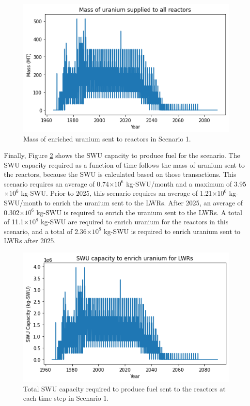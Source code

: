 \begin{figure}
    \centering 
    \includegraphics[width=\textwidth]{../figures/fuelsupply_scenarios_1.png}
    \caption{Mass of enriched uranium sent to reactors in Scenario 1.}
    \label{fig:fuel_1}
\end{figure}

Finally, Figure \ref{fig:swu_1} shows the \gls{SWU} capacity to produce 
fuel for the scenario. The \gls{SWU} capacity required as a function of 
time follows the mass of uranium sent to the reactors, because the \gls{SWU}
is calculated based on those transactions. This scenario requires an 
average of 0.74$\times 10^6$ kg-\gls{SWU}/month and a maximum of 
3.95$\times 10^6$ kg-\gls{SWU}. Prior to 2025, this scenario requires 
an average of 1.21$\times 10^6$ kg-\gls{SWU}/month to enrich the uranium 
sent to the \glspl{LWR}.
After 2025, an average of 0.302$\times 10^6$ kg-\gls{SWU} is required to 
enrich the uranium sent to the \glspl{LWR}.
A total of 11.1$\times 10^8$ kg-SWU are required to enrich uranium for the 
reactors in this scenario, and a total of 2.36$\times 10^8$ kg-SWU is required 
to enrich uranium sent to \glspl{LWR} after 2025. 

\begin{figure}
    \centering
    \includegraphics[width=\textwidth]{../figures/totalswu_scenarios_1.png}
    \caption{Total \gls{SWU} capacity required to produce fuel sent to the 
    reactors at each time step in Scenario 1.}
    \label{fig:swu_1}
\end{figure}

